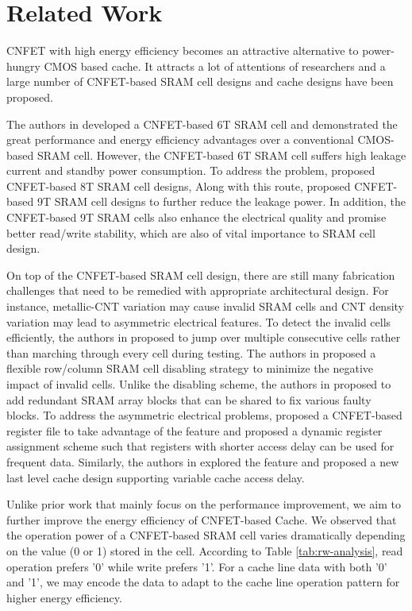 \section{Related Work} \label{sec:relatedwork}
CNFET with high energy efficiency becomes an attractive 
alternative to power-hungry CMOS based cache. It attracts 
a lot of attentions of researchers and a large number of 
CNFET-based SRAM cell designs and cache designs have been 
proposed.

The authors in \cite{wang2011design,wang2011high} developed 
a CNFET-based 6T SRAM cell and demonstrated the great 
performance and energy efficiency advantages over a conventional 
CMOS-based SRAM cell. However, the CNFET-based 6T SRAM cell suffers 
high leakage current and standby power consumption. To address the problem,
\cite{zhang2012sram,kim2008low} proposed CNFET-based 8T SRAM cell designs, 
Along with this route, \cite{sun2014novel, sun2017high} proposed 
CNFET-based 9T SRAM cell designs to further reduce the leakage power.
In addition, the CNFET-based 9T SRAM cells also enhance the electrical 
quality and promise better read/write stability, which are also of 
vital importance to SRAM cell design. 

On top of the CNFET-based SRAM cell design, there are still many 
fabrication challenges that need to be remedied with appropriate 
architectural design. For instance, metallic-CNT variation may cause 
invalid SRAM cells and CNT density variation may lead to asymmetric 
electrical features. To detect the invalid cells efficiently, 
the authors in \cite{xie2015jump, Li2016A} proposed to jump over 
multiple consecutive cells rather than marching through every cell 
during testing. The authors in \cite{jiang2017cnfet} proposed a flexible 
row/column SRAM cell disabling strategy to minimize the negative impact of 
invalid cells. Unlike the disabling scheme, the authors in \cite{li2016defect} 
proposed to add redundant SRAM array blocks that can be shared to fix 
various faulty blocks. To address the asymmetric electrical problems, 
\cite{jiang2017cnfet} proposed a CNFET-based register file to take advantage of the 
feature and proposed a dynamic register assignment scheme such that registers with 
shorter access delay can be used for frequent data. Similarly, the authors in 
\cite{xu2019exploring} explored the feature and proposed a new last level cache design 
supporting variable cache access delay.

Unlike prior work that mainly focus on the performance improvement, we aim to further 
improve the energy efficiency of CNFET-based Cache. We observed that the operation 
power of a CNFET-based SRAM cell \cite{sun2014novel, sun2017high} varies 
dramatically depending on the value (0 or 1) stored in the cell. According to 
Table \ref{tab:rw-analysis}, read operation prefers '0' while write prefers '1'. 
For a cache line data with both '0' and '1', we may encode the data to adapt to 
the cache line operation pattern for higher energy efficiency.

